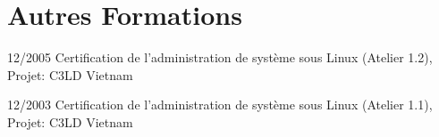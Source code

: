 \section{Autres Formations}

%

 

%
\cventry
{12/2005}
{Certification de l'administration de système sous Linux}
{(Atelier 1.2), Projet: C3LD}
{}
{Vietnam}
{}


%
\vspace{-10pt}
\cventry
{12/2003}
{Certification de l'administration de système sous Linux}
{(Atelier 1.1), Projet: C3LD}
{}
{Vietnam}
{}

%


%

